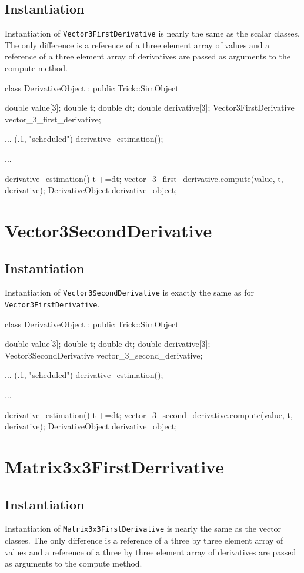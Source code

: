 \documentclass{report}
\begin{document}
\subsection{Instantiation}
Instantiation of \verb|Vector3FirstDerivative| is nearly the same as the scalar classes. The only difference is a reference of a three element array of values and a reference of a three element array of derivatives are passed as arguments to the compute method.

\begin{code}
class DerivativeObject : public Trick::SimObject{
    double value[3];
    double t; 
    double dt;
    double derivative[3];
    Vector3FirstDerivative vector_3_first_derivative;

    ...
        (.1, "scheduled") derivative_estimation();
    
    ...

    derivative_estimation(){
        t +=dt;
        vector_3_first_derivative.compute(value, t, derivative);
    }
    DerivativeObject derivative_object;
}
\end{code}
\section{Vector3SecondDerivative}
\subsection{Instantiation}
Instantiation of \verb|Vector3SecondDerivative| is exactly the same as for \verb|Vector3FirstDerivative|.

\begin{code}
class DerivativeObject : public Trick::SimObject{
    double value[3];
    double t; 
    double dt;
    double derivative[3];
    Vector3SecondDerivative vector_3_second_derivative;

    ...
        (.1, "scheduled") derivative_estimation();
    
    ...

    derivative_estimation(){
        t +=dt;
        vector_3_second_derivative.compute(value, t, derivative);
    }
    DerivativeObject derivative_object;
}
\end{code}
\section{Matrix3x3FirstDerrivative}
\subsection{Instantiation}
Instantiation of \verb|Matrix3x3FirstDerivative| is nearly the same as the vector classes. The only difference is a reference of a three by three element array of values and a reference of a three by three element array of derivatives are passed as arguments to the compute method.
\end{document}
